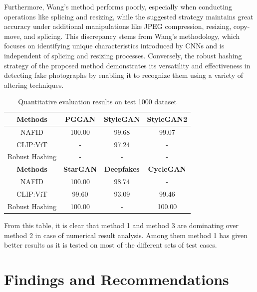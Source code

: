 \documentclass[a4paper,14pt]{report}
\begin{document}
Furthermore, Wang's method performs poorly, especially when conducting operations like splicing and resizing, while the suggested strategy maintains great accuracy under additional manipulations like JPEG compression, resizing, copy-move, and splicing. This discrepancy stems from Wang's methodology, which focuses on identifying unique characteristics introduced by CNNs and is independent of splicing and resizing processes. Conversely, the robust hashing strategy of the proposed method demonstrates its versatility and effectiveness in detecting fake photographs by enabling it to recognize them using a variety of altering techniques.

\begin{table}[H]
    \centering
    \caption{Quantitative evaluation results on test 1000 dataset}
    \label{tab:results_test_1000}
    \begin{tabular}{|c|c|c|c|}
        \hline
        \textbf{Methods} & \textbf{PGGAN} &\textbf{StyleGAN} &\textbf{StyleGAN2}\\ \hline
        NAFID & 100.00 & 99.68 & 99.07 \\ \hline
        CLIP:ViT & - & 97.24 & -  \\ \hline
        Robust Hashing & - & - & - \\ \hline
        \hline
        \textbf{Methods} & \textbf{StarGAN} &\textbf{Deepfakes} &\textbf{CycleGAN}\\ \hline
        NAFID & 100.00 & 98.74 & - \\ \hline
        CLIP:ViT & 99.60 & 93.09 & 99.46  \\ \hline
        Robust Hashing & 100.00 & - & 100.00 \\ \hline
    \end{tabular}
\end{table}
From this table, it is clear that method 1 and method 3 are dominating over method 2 in case of numerical result analysis. Among them method 1 has given better results as it is tested on most of the different sets of test cases.

\chapter{Findings and Recommendations}
\end{document}
